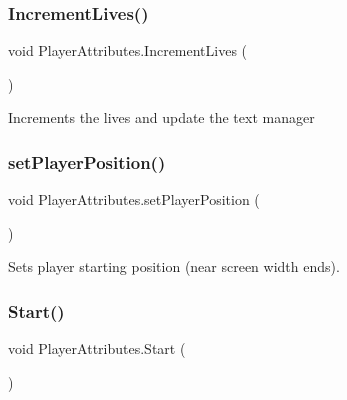 \mbox{\label{class_player_attributes_a0dfec30b6ea5d4246790c1038c6e4c45}} 
\subsubsection{\texorpdfstring{Increment\+Lives()}{IncrementLives()}}
{\footnotesize\ttfamily void Player\+Attributes.\+Increment\+Lives (\begin{DoxyParamCaption}{ }\end{DoxyParamCaption})}



Increments the lives and update the text manager 

\mbox{\label{class_player_attributes_a9c30141dd1440bd1495b69b0f261190c}} 
\subsubsection{\texorpdfstring{set\+Player\+Position()}{setPlayerPosition()}}
{\footnotesize\ttfamily void Player\+Attributes.\+set\+Player\+Position (\begin{DoxyParamCaption}{ }\end{DoxyParamCaption})\hspace{0.3cm}{\ttfamily [private]}}



Sets player starting position (near screen width ends). 

\mbox{\label{class_player_attributes_afa03395e71444c6bbaa339236b13ff64}} 
\subsubsection{\texorpdfstring{Start()}{Start()}}
{\footnotesize\ttfamily void Player\+Attributes.\+Start (\begin{DoxyParamCaption}{ }\end{DoxyParamCaption})\hspace{0.3cm}{\ttfamily [private]}}



